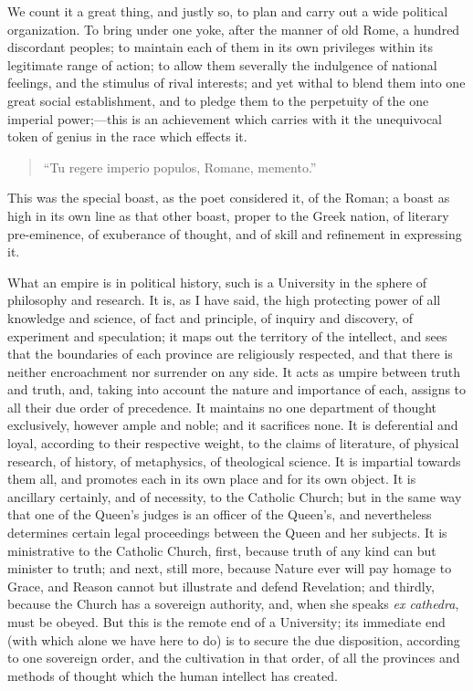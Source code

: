 We count it a great thing, and justly so, to plan and carry out a
wide political organization. To bring under one yoke, after the manner
of old Rome, a hundred discordant peoples; to maintain each of them in
its own privileges within its legitimate range of action; to allow
them severally the indulgence of national feelings, and the stimulus
of rival interests; and yet withal to blend them into one great social
establishment, and to pledge them to the perpetuity of the one
imperial power;—this is an achievement which carries with it the
unequivocal token of genius in the race which effects it.

\begin{quote}

``Tu regere imperio populos, Romane, memento.''

\end{quote}

This was the special boast, as the poet considered it, of the
Roman; a boast as high in its own line as that other boast, proper to
the Greek nation, of literary pre-eminence, of exuberance of thought,
and of skill and refinement in expressing it.

What an empire is in political history, such is a University in the
sphere of philosophy and research. It is, as I have said, the high
protecting power of all knowledge and science, of fact and principle,
of inquiry and discovery, of experiment and speculation; it maps out
the territory of the intellect, and sees that the boundaries of each
province are religiously respected, and that there is neither
encroachment nor surrender on any side. It acts as umpire between
truth and truth, and, taking into account the nature and importance of
each, assigns to all their due order of precedence. It maintains no
one department of thought exclusively, however ample and noble; and it
sacrifices none. It is deferential and loyal, according to their
respective weight, to the claims of literature, of physical research,
of history, of metaphysics, of theological science. It is impartial
towards them all, and promotes each in its own place and for its own
object. It is ancillary certainly, and of necessity, to the Catholic
Church; but in the same way that one of the Queen's judges is an
officer of the Queen's, and nevertheless determines certain legal
proceedings between the Queen and her subjects. It is ministrative to
the Catholic Church, first, because truth of any kind can but minister
to truth; and next, still more, because Nature ever will pay homage to
Grace, and Reason cannot but illustrate and defend Revelation; and
thirdly, because the Church has a sovereign authority, and, when she
speaks \emph{ex cathedra}, must be obeyed. But this is the remote end
of a University; its immediate end (with which alone we have here to
do) is to secure the due disposition, according to one sovereign
order, and the cultivation in that order, of all the provinces and
methods of thought which the human intellect has created.

